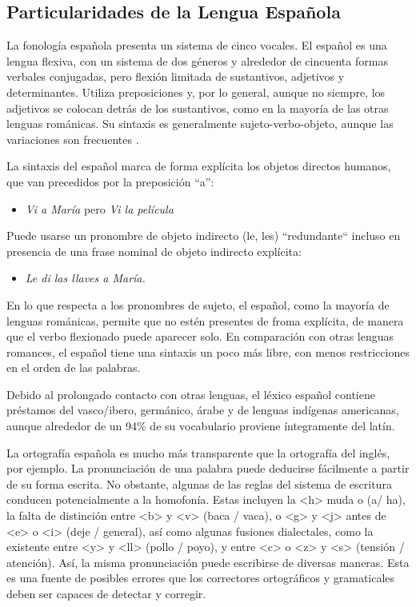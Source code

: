 \begin{multicols}{2}
\subsection{Particularidades de la Lengua Española}

La fonología española presenta un sistema de cinco vocales. El español es una lengua flexiva, con un sistema de dos géneros y alrededor de cincuenta formas verbales conjugadas, pero flexión limitada de sustantivos, adjetivos y determinantes. Utiliza preposiciones y, por lo general, aunque no siempre, los adjetivos se colocan detrás de los sustantivos, como en la mayoría de las otras lenguas románicas. Su sintaxis es generalmente sujeto-verbo-objeto, aunque las variaciones son frecuentes \cite{spanishgram}.


La sintaxis del español marca de forma explícita los objetos directos humanos, que van precedidos por la preposición ``a'':

\begin{itemize}
\item[] \textit{Vi a María} pero \textit{Vi la película}
\end{itemize}
  
Puede usarse un pronombre de objeto indirecto (le, les) “redundante“  incluso en presencia de una frase nominal de objeto indirecto explícita:

\begin{itemize}
\item[] \textit{Le di las llaves a María.}
\end{itemize}

En lo que respecta a los pronombres de sujeto, el español, como la mayoría de lenguas románicas, permite que no estén presentes de froma explícita, de manera que el verbo flexionado puede aparecer solo. En comparación con otras lenguas romances, el español tiene una sintaxis un poco más libre, con menos restricciones en el orden de las palabras.

Debido al prolongado contacto con otras lenguas, el léxico español contiene préstamos del vasco/ibero, germánico, árabe y de lenguas indígenas americanas, aunque alrededor de un 94\% de su vocabulario proviene íntegramente del latín.

La ortografía española es mucho más transparente que la ortografía del inglés, por ejemplo. La pronunciación de una palabra puede deducirse fácilmente a partir de su forma escrita. No obstante, algunas de las reglas del sistema de escritura conducen potencialmente a la homofonía. Estas incluyen la <h> muda o (a/ ha), la falta de distinción entre <b> y <v> (baca / vaca), o <g> y <j> antes de <e> o <i> (deje / general), así como algunas fusiones dialectales, como la existente entre <y> y <ll> (pollo / poyo), y entre <c> o <z> y <s> (tensión / atención). Así, la misma pronunciación puede escribirse de diversas maneras. Esta es una fuente de posibles errores que los correctores ortográficos y gramaticales deben ser capaces de detectar y corregir.


\end{multicols}
